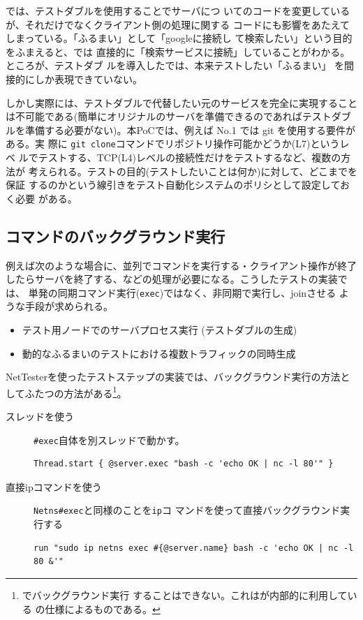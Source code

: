 では、テストダブルを使用することでサーバにつ
いてのコードを変更しているが、それだけでなくクライアント側の処理に関する
コードにも影響をあたえてしまっている。「ふるまい」として「googleに接続し
て検索したい」という目的をふまえると、では
直接的に「検索サービスに接続」していることがわかる。ところが、テストダブ
ルを導入したでは、本来テストしたい「ふるまい」
を間接的にしか表現できていない。

しかし実際には、テストダブルで代替したい元のサービスを完全に実現すること
は不可能である(簡単にオリジナルのサーバを準備できるのであればテストダブ
ルを準備する必要がない)。本PoCでは、例えば
 No.1 では git を使用する要件がある。実
際に \verb|git clone|コマンドでリポジトリ操作可能かどうか(L7)というレベ
ルでテストする、TCP(L4)レベルの接続性だけをテストするなど、複数の方法が
考えられる。テストの目的(テストしたいことは何か)に対して、どこまでを保証
するのかという線引きをテスト自動化システムのポリシとして設定しておく必要
がある。

  \subsection{コマンドのバックグラウンド実行}
  \label{sec:background-exec-method}

例えば次のような場合に、並列でコマンドを実行する・クライアント操作が終了
したらサーバを終了する、などの処理が必要になる。こうしたテストの実装では、
単発の同期コマンド実行(\verb|exec|)ではなく、非同期で実行し、joinさせる
ような手段が求められる。
\begin{itemize}
 \item テスト用ノードでのサーバプロセス実行 (テストダブルの生成)
 \item 動的なふるまいのテストにおける複数トラフィックの同時生成
\end{itemize}

NetTesterを使ったテストステップの実装では、バックグラウンド実行の方法と
してふたつの方法がある\footnote{でバックグラウンド実行
することはできない。これはが内部的に利用している
の仕様によるものである。}。
\begin{description}
 \item[スレッドを使う] \verb|#exec|自体を別スレッドで動かす。
\begin{lstlisting}
Thread.start { @server.exec "bash -c 'echo OK | nc -l 80'" }
\end{lstlisting}
 \item[直接ipコマンドを使う] \verb|Netns#exec|と同様のことを\verb|ip|コ
            マンドを使って直接バックグラウンド実行する
\begin{lstlisting}
run "sudo ip netns exec #{@server.name} bash -c 'echo OK | nc -l 80 &'"
\end{lstlisting}
\end{description}

